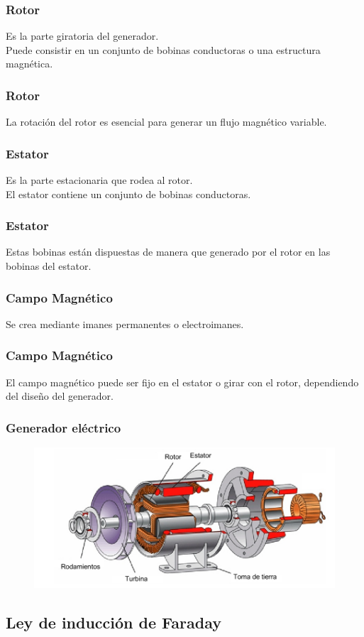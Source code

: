 \documentclass[14pt]{beamer}
\begin{document}
\begin{frame}
\frametitle{Rotor}
Es la parte giratoria del generador.
\\
\bigskip
\pause
Puede consistir en un conjunto de bobinas conductoras o una estructura magnética.
\end{frame}
\begin{frame}
\frametitle{Rotor}
La rotación del rotor es esencial para generar un flujo magnético variable.
\end{frame}
\begin{frame}
\frametitle{Estator}
Es la parte estacionaria que rodea al rotor.
\\
\bigskip
\pause
El estator contiene un conjunto de bobinas conductoras.
\end{frame}
\begin{frame}
\frametitle{Estator}
Estas bobinas están dispuestas de manera que  generado por el rotor \pause {} en las bobinas del estator.
\end{frame}
\begin{frame}
\frametitle{Campo Magnético}
Se crea mediante imanes permanentes o electroimanes.
\end{frame}
\begin{frame}
\frametitle{Campo Magnético}
El campo magnético puede ser fijo en el estator o girar con el rotor, dependiendo del diseño del generador.
\end{frame}
\begin{frame}
\frametitle{Generador eléctrico}
\vspace*{-1cm}
\begin{figure}
\centering
\includegraphics[scale=0.36]{Imagenes/Generador_01.jpg}
\end{figure}
\end{frame}

\subsection{Ley de inducción de Faraday}
\end{document}
